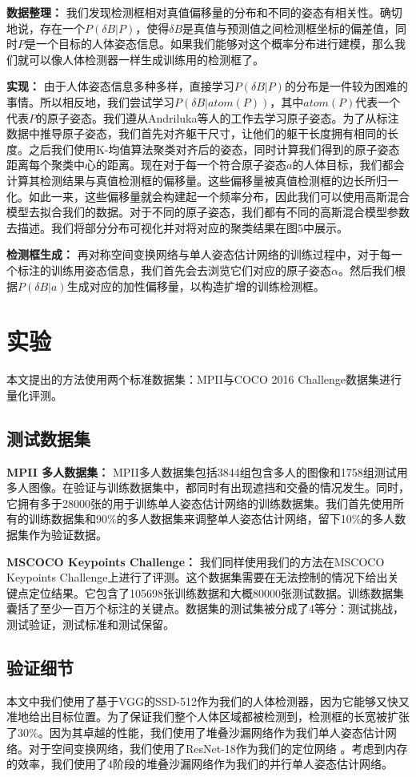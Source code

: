 \textbf{数据整理：} 我们发现检测框相对真值偏移量的分布和不同的姿态有相关性。确切地说，存在一个$P(\delta B|P)$，使得$\delta B$是真值与预测值之间检测框坐标的偏差值，同时$P$是一个目标的人体姿态信息。如果我们能够对这个概率分布进行建模，那么我们就可以像人体检测器一样生成训练用的检测框了。

\textbf{实现：} 由于人体姿态信息多种多样，直接学习$P(\delta B|P)$的分布是一件较为困难的事情。所以相反地，我们尝试学习$P(\delta B|atom(P))$，其中$atom(P)$代表一个代表$P$的原子姿态。我们遵从Andriluka等人的工作去学习原子姿态。为了从标注数据中推导原子姿态，我们首先对齐躯干尺寸，让他们的躯干长度拥有相同的长度。之后我们使用K-均值算法聚类对齐后的姿态，同时计算我们得到的原子姿态距离每个聚类中心的距离。现在对于每一个符合原子姿态$a$的人体目标，我们都会计算其检测结果与真值检测框的偏移量。这些偏移量被真值检测框的边长所归一化。如此一来，这些偏移量就会构建起一个频率分布，因此我们可以使用高斯混合模型去拟合我们的数据。对于不同的原子姿态，我们都有不同的高斯混合模型参数去描述。我们将部分分布可视化并对将对应的聚类结果在图5中展示。

\textbf{检测框生成：} 再对称空间变换网络与单人姿态估计网络的训练过程中，对于每一个标注的训练用姿态信息，我们首先会去浏览它们对应的原子姿态$\alpha$。然后我们根据$P(\delta B|a)$生成对应的加性偏移量，以构造扩增的训练检测框。

\section*{实验}
本文提出的方法使用两个标准数据集：MPII与COCO 2016 Challenge数据集进行量化评测。

\subsection*{测试数据集}
\textbf{MPII 多人数据集：} MPII多人数据集包括3844组包含多人的图像和1758组测试用多人图像。在验证与训练数据集中，都同时有出现遮挡和交叠的情况发生。同时，它拥有多于28000张的用于训练单人姿态估计网络的训练数据集。我们首先使用所有的训练数据集和90\%的多人数据集来调整单人姿态估计网络，留下10\%的多人数据集作为验证数据。

\textbf{MSCOCO Keypoints Challenge：} 我们同样使用我们的方法在MSCOCO Keypoints Challenge上进行了评测。这个数据集需要在无法控制的情况下给出关键点定位结果。它包含了105698张训练数据和大概80000张测试数据。训练数据集囊括了至少一百万个标注的关键点。数据集的测试集被分成了4等分：测试挑战，测试验证，测试标准和测试保留。

\subsection*{验证细节}
本文中我们使用了基于VGG的SSD-512作为我们的人体检测器，因为它能够又快又准地给出目标位置。为了保证我们整个人体区域都被检测到，检测框的长宽被扩张了30\%。因为其卓越的性能，我们使用了堆叠沙漏网络作为我们单人姿态估计网络。对于空间变换网络，我们使用了ResNet-18作为我们的定位网络 。考虑到内存的效率，我们使用了4阶段的堆叠沙漏网络作为我们的并行单人姿态估计网络。

